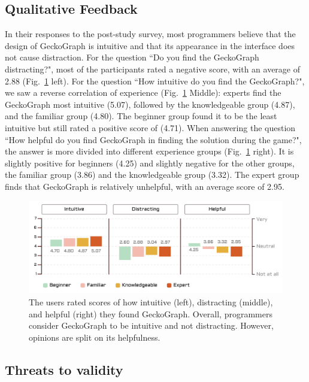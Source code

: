 \subsection{Qualitative Feedback}
In their responses to the post-study survey, most programmers believe that the design of GeckoGraph is intuitive and that its appearance in the interface does not cause distraction.
For the question ``Do you find the GeckoGraph distracting?", most of the participants rated a negative score, with an average of 2.88 (Fig.~\ref{fig:qualitative} left). For the question ``How intuitive do you find the GeckoGraph?", we saw a reverse correlation of experience (Fig.~\ref{fig:qualitative} Middle): experts find the GeckoGraph most intuitive (5.07), followed by the knowledgeable group (4.87), and the familiar group (4.80). The beginner group found it to be the least intuitive but still rated a positive score of (4.71). 
 When answering the question ``How helpful do you find GeckoGraph in finding the solution during the game?", the answer is more divided into different experience groups (Fig.~\ref{fig:qualitative} right). It is slightly positive for beginners (4.25) and slightly negative for the other groups, the familiar group (3.86) and the knowledgeable group (3.32). The expert group finds that GeckoGraph is relatively unhelpful, with an average score of 2.95.



\begin{figure}[hbt]
  \includegraphics[width=\linewidth]{figures/Qualitative}
  \caption[The users rated scores of how intuitive (left), distracting (middle), and helpful (right) they found GeckoGraph]{\label{fig:qualitative} The users rated scores of how intuitive (left), distracting (middle), and helpful (right) they found GeckoGraph. Overall, programmers consider GeckoGraph to be intuitive and not distracting. However, opinions are split on its helpfulness. }
\end{figure}



\subsection{Threats to validity}

